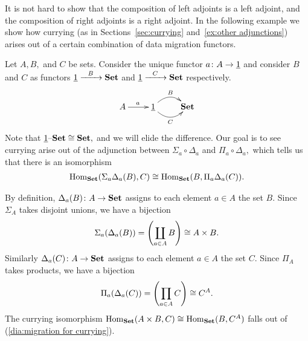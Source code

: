 \documentclass[../main/CT4S-EN-RU]{subfiles}
\begin{document}
\begin{exampleRUS}
\end{exampleRUS}

\begin{blockENG}
It is not hard to show that the composition of left adjoints is a left adjoint, and the composition of right adjoints is a right adjoint. In the following example we show how currying (as in Sections~\ref{sec:currying} and~\ref{ex:other adjunctions}) arises out of a certain combination of data migration functors. 
\end{blockENG}

\begin{blockRUS}
\end{blockRUS}

\begin{exampleENG}
Let $A,B,$ and $C$ be sets. Consider the unique functor $a\colon A\rightarrow\underline{1}$ and consider $B$ and $C$ as functors $\underline{1}\xrightarrow{\ \ B\ \ }{\mathbf{Set}}$ and $\underline{1}\xrightarrow{\ \ C\ \ }{\mathbf{Set}}$ respectively. 
$$\xymatrix{A\ar[r]^a&\ul{1}\ar@/^1pc/[r]^B\ar@/_1pc/[r]_C&\Set}$$
Note that $\underline{1}{\text \textendash}{\mathbf{Set}}\cong{\mathbf{Set}},$ and we will elide the difference. Our goal is to see currying arise out of the adjunction between $\Sigma_a\circ\Delta_a$ and $\Pi_a\circ\Delta_a,$ which tells us that there is an isomorphism
\begin{align}\label{dia:migration for currying}
\operatorname{Hom}_{\mathbf{Set}}(\Sigma_a\Delta_a(B),C)\cong\operatorname{Hom}_{\mathbf{Set}}(B,\Pi_a\Delta_a(C)).
\end{align}

By definition, $\Delta_a(B)\colon A\rightarrow{\mathbf{Set}}$ assigns to each element $a\in A$ the set $B.$ Since $\Sigma_A$ takes disjoint unions, we have a bijection
$$\Sigma_a(\Delta_a(B))=\left(\coprod_{a\in A}B\right)\cong A\times B.$$ 
Similarly $\Delta_a(C)\colon A\rightarrow{\mathbf{Set}}$ assigns to each element $a\in A$ the set $C.$ Since $\Pi_A$ takes products, we have a bijection
$$\Pi_a(\Delta_a(C))=\left(\prod_{a\in A}C\right)\cong C^A.$$
The currying isomorphism $\operatorname{Hom}_{\mathbf{Set}}(A\times B,C)\cong\operatorname{Hom}_{\mathbf{Set}}(B,C^A)$ falls out of (\ref{dia:migration for currying}).
\end{exampleENG}

\begin{exampleRUS}
\end{exampleRUS}


\subsection{}
\end{document}
